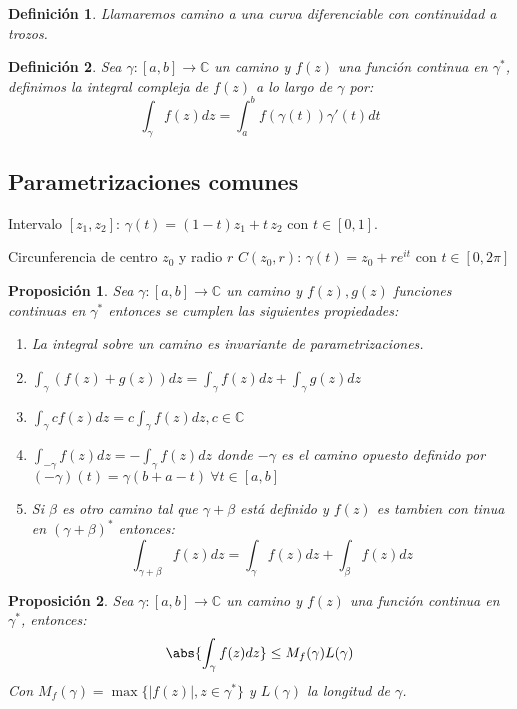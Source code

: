 \documentclass[10pt]{book}
\newtheorem{defi}{Definición}[chapter]
\newtheorem{prop}{Proposición}[chapter]
\newcommand{\C}{\mathbb{C}}
\begin{document}
\begin{defi}
Llamaremos camino a una curva diferenciable con continuidad a trozos.

\end{defi}

\begin{defi}
Sea  $\gamma:[a,b]\longrightarrow \C$ un camino y $f(z)$ una función continua en $\gamma^*$, definimos la integral compleja de $f(z)$ a lo largo de $\gamma$ por:
$$
\int_{\gamma} f(z) dz = \int_a^b f(\gamma(t)) \gamma'(t)dt
$$
\end{defi}

\subsection*{Parametrizaciones comunes}
Intervalo $[z_1,z_2]$: $\gamma(t) = (1-t)z_1 +t \, z_2$ con $t\in [0,1]$.

Circunferencia de centro $z_0$ y radio $r$ $C(z_0,r)$: $\gamma(t) = z_0 + re^{it}$ con $t\in[0,2\pi]$ 

\begin{prop}
Sea $\gamma:[a,b]\longrightarrow \C$ un camino y $f(z), g(z)$ funciones continuas en $\gamma^*$ entonces se cumplen las siguientes propiedades:
\begin{enumerate}
\item La integral sobre un camino es invariante de parametrizaciones.
\item $\int_\gamma (f(z)+g(z)) dz = \int_\gamma f(z)dz + \int_\gamma g(z) dz$
\item $\int_\gamma c f(z) dz = c \int_\gamma f(z) dz, c\in\C$
\item $\int_{-\gamma} f(z) dz = -\int_\gamma f(z) dz$ donde $-\gamma$ es el camino opuesto definido por $(-\gamma)(t) = \gamma(b+a-t) \ \forall t \in [a,b]$
\item Si $\beta$ es otro camino tal que $\gamma + \beta$ está definido y $f(z)$ es tambien con tinua en $(\gamma+\beta)^*$ entonces:
$$
\int_{\gamma+\beta}f(z)dz = \int_\gamma f(z)dz + \int_\beta f(z)dz
$$
\end{enumerate}
\end{prop}


\begin{prop}
Sea $\gamma:[a,b]\longrightarrow \C$ un camino y $f(z)$ una función continua en $\gamma^*$, entonces:
$$\abs{\int_\gamma f(z)dz }\leq M_f(\gamma)L(\gamma)$$
Con $M_f(\gamma) = \max \{|f(z)|,z \in \gamma^* \}$ y $L(\gamma)$ la longitud de $\gamma$.
\end{prop}
\end{document}
